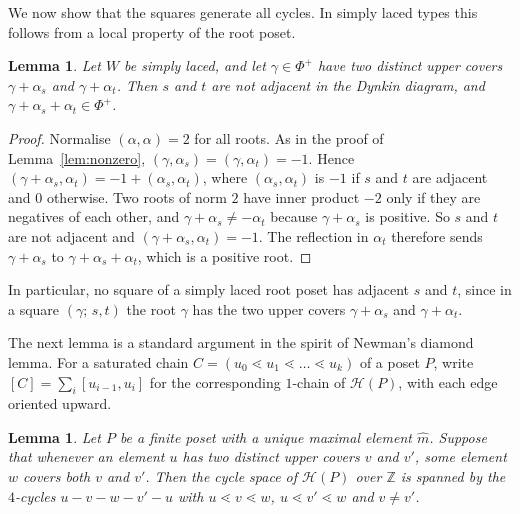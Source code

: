 \documentclass[11pt]{amsart}
\newtheorem{lemma}[theorem]{Lemma}
\theoremstyle{definition}
\newcommand{\Hasse}{\mathcal H}
\begin{document}
We now show that the squares generate all cycles. In simply laced types this follows from a local property of the root poset.

\begin{lemma}\label{lem:sl}
Let $W$ be simply laced, and let $\gamma\in\Phi^+$ have two distinct upper covers $\gamma+\alpha_s$ and $\gamma+\alpha_t$. Then $s$ and $t$ are not adjacent in the Dynkin diagram, and $\gamma+\alpha_s+\alpha_t\in\Phi^+$.
\end{lemma}

\begin{proof}
Normalise $(\alpha,\alpha)=2$ for all roots. As in the proof of Lemma~\ref{lem:nonzero}, $(\gamma,\alpha_s)=(\gamma,\alpha_t)=-1$. Hence $(\gamma+\alpha_s,\alpha_t)=-1+(\alpha_s,\alpha_t)$, where $(\alpha_s,\alpha_t)$ is $-1$ if $s$ and $t$ are adjacent and $0$ otherwise. Two roots of norm $2$ have inner product $-2$ only if they are negatives of each other, and $\gamma+\alpha_s\neq-\alpha_t$ because $\gamma+\alpha_s$ is positive. So $s$ and $t$ are not adjacent and $(\gamma+\alpha_s,\alpha_t)=-1$. The reflection in $\alpha_t$ therefore sends $\gamma+\alpha_s$ to $\gamma+\alpha_s+\alpha_t$, which is a positive root.
\end{proof}

In particular, no square of a simply laced root poset has adjacent $s$ and $t$, since in a square $(\gamma;\,s,t)$ the root $\gamma$ has the two upper covers $\gamma+\alpha_s$ and $\gamma+\alpha_t$.

The next lemma is a standard argument in the spirit of Newman's diamond lemma. For a saturated chain $C=(u_0\lessdot u_1\lessdot\dots\lessdot u_k)$ of a poset $P$, write $[C]=\sum_{i}[u_{i-1},u_i]$ for the corresponding $1$-chain of $\Hasse(P)$, with each edge oriented upward.

\begin{lemma}\label{lem:diamond}
Let $P$ be a finite poset with a unique maximal element $\hat m$. Suppose that whenever an element $u$ has two distinct upper covers $v$ and $v'$, some element $w$ covers both $v$ and $v'$. Then the cycle space of $\Hasse(P)$ over $\mathbb Z$ is spanned by the $4$-cycles $u - v - w - v' - u$ with $u\lessdot v\lessdot w$, $u\lessdot v'\lessdot w$ and $v\neq v'$.
\end{lemma}
\end{document}
